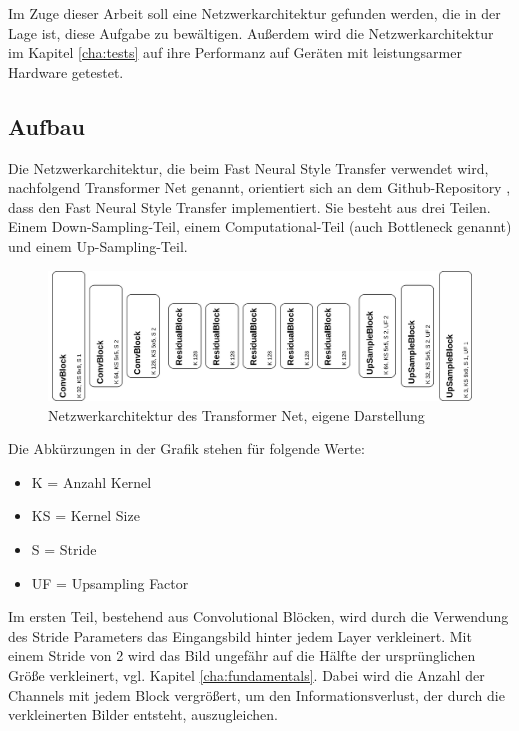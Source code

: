 Im Zuge dieser Arbeit soll eine Netzwerkarchitektur gefunden werden, die in der Lage ist, diese Aufgabe zu bewältigen. Außerdem wird die Netzwerkarchitektur im Kapitel \ref{cha:tests} auf ihre Performanz auf Geräten mit leistungsarmer Hardware getestet.

\subsection{Aufbau}
\label{sec:aufbau}

Die Netzwerkarchitektur, die beim Fast Neural Style Transfer verwendet wird, nachfolgend Transformer Net genannt, orientiert sich an dem Github-Repository \cite{PyTorchFastNeuralStyle}, dass den Fast Neural Style Transfer implementiert.
Sie besteht aus drei Teilen. Einem Down-Sampling-Teil, einem Computational-Teil (auch Bottleneck genannt) und einem Up-Sampling-Teil.

\begin{figure}[H]
	\centering
	\includegraphics[width=1.0\textwidth]{resources/content/transformer_net.png}
	\caption{Netzwerkarchitektur des Transformer Net, eigene Darstellung}
	\label{img:transformer_net_img}
\end{figure}

Die Abkürzungen in der Grafik stehen für folgende Werte:

\begin{itemize}
	\item K = Anzahl Kernel
	\item KS = Kernel Size
	\item S = Stride
	\item UF = Upsampling Factor
\end{itemize}

Im ersten Teil, bestehend aus Convolutional Blöcken, wird durch die Verwendung des Stride Parameters das Eingangsbild hinter jedem Layer verkleinert. Mit einem Stride von 2 wird das Bild ungefähr auf die Hälfte der ursprünglichen Größe verkleinert, vgl. Kapitel \ref{cha:fundamentals}. Dabei wird die Anzahl der Channels mit jedem Block vergrößert, um den Informationsverlust, der durch die verkleinerten Bilder entsteht, auszugleichen.

